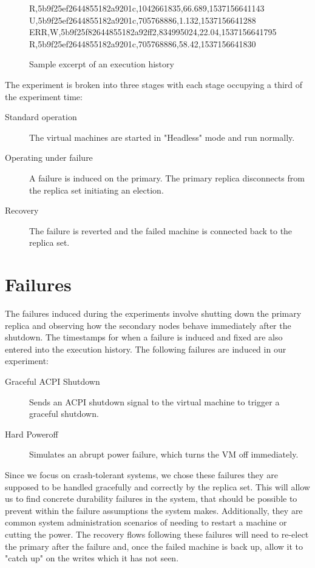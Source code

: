 \begin{figure}
    \begin{CVerbatim}
R,5b9f25ef2644855182a9201c,1042661835,66.689,1537156641143
U,5b9f25ef2644855182a9201c,705768886,1.132,1537156641288
ERR,W,5b9f25f82644855182a92ff2,834995024,22.04,1537156641795
R,5b9f25ef2644855182a9201c,705768886,58.42,1537156641830
    \end{CVerbatim}
    \caption{Sample excerpt of an execution history}
\end{figure}

The experiment is broken into three stages with each stage occupying a third of the experiment time:

\begin{description}
    \item[Standard operation] The virtual machines are started in "Headless" mode and run normally.
    \item[Operating under failure] A failure is induced on the primary. The primary replica disconnects from the replica set initiating an election. 
    \item[Recovery] The failure is reverted and the failed machine is connected back to the replica set.
\end{description}

\section{Failures}

The failures induced during the experiments involve shutting down the primary replica and observing how the secondary nodes behave immediately after the shutdown. The timestamps for when a failure is induced and fixed are also entered into the execution history. 
The following failures are induced in our experiment:

\begin{description}
    \item[Graceful ACPI Shutdown] Sends an ACPI shutdown signal to the virtual machine to trigger a graceful shutdown.
    \item[Hard Poweroff] Simulates an abrupt power failure, which turns the VM off immediately.
\end{description}

Since we focus on crash-tolerant systems, we chose these failures they are supposed to be handled gracefully and correctly by the replica set. This will allow us to find concrete durability failures in the system, that should be possible to prevent within the failure assumptions the system makes. Additionally, they are common system administration scenarios of needing to restart a machine or cutting the power. The recovery flows following these failures will need to re-elect the primary after the failure and, once the failed machine is back up, allow it to "catch up" on the writes which it has not seen.

